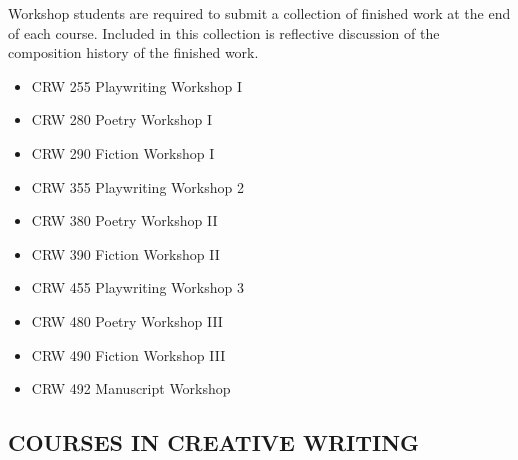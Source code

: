 \documentclass[
  letterpaper,
]{scrbook}
\providecommand{\tightlist}{%
  \setlength{\itemsep}{0pt}\setlength{\parskip}{0pt}}
\begin{document}
Workshop students are required to submit a collection of finished work
at the end of each course. Included in this collection is reflective
discussion of the composition history of the finished work.

\begin{itemize}
\tightlist
\item
  CRW 255 Playwriting Workshop I
\item
  CRW 280 Poetry Workshop I
\item
  CRW 290 Fiction Workshop I
\item
  CRW 355 Playwriting Workshop 2
\item
  CRW 380 Poetry Workshop II
\item
  CRW 390 Fiction Workshop II
\item
  CRW 455 Playwriting Workshop 3
\item
  CRW 480 Poetry Workshop III
\item
  CRW 490 Fiction Workshop III
\item
  CRW 492 Manuscript Workshop
\end{itemize}

\subsection{COURSES IN CREATIVE
WRITING}\label{sec-courses-in-creative-writing}
\end{document}
